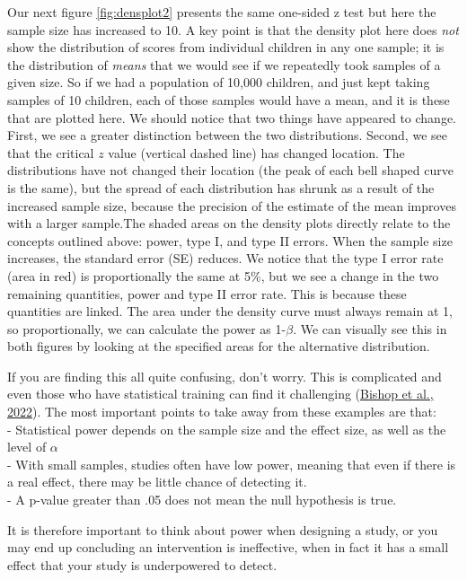 \documentclass{krantz}
\begin{document}
Our next figure \ref{fig:densplot2} presents the same one-sided z test but here the sample size has increased to 10. A key point is that the density plot here does \emph{not} show the distribution of scores from individual children in any one sample; it is the distribution of \emph{means} that we would see if we repeatedly took samples of a given size. So if we had a population of 10,000 children, and just kept taking samples of 10 children, each of those samples would have a mean, and it is these that are plotted here. We should notice that two things have appeared to change. First, we see a greater distinction between the two distributions. Second, we see that the critical \(z\) value (vertical dashed line) has changed location. The distributions have not changed their location (the peak of each bell shaped curve is the same), but the spread of each distribution has shrunk as a result of the increased sample size, because the precision of the estimate of the mean improves with a larger sample.The shaded areas on the density plots directly relate to the concepts outlined above: power, type I, and type II errors. When the sample size increases, the standard error (SE) reduces. We notice that the type I error rate (area in red) is proportionally the same at 5\%, but we see a change in the two remaining quantities, power and type II error rate. This is because these quantities are linked. The area under the density curve must always remain at 1, so proportionally, we can calculate the power as 1-\(\beta\). We can visually see this in both figures by looking at the specified areas for the alternative distribution.

If you are finding this all quite confusing, don't worry. This is complicated and even those who have statistical training can find it challenging (\protect\hyperlink{ref-bishop2022a}{Bishop et al., 2022}). The most important points to take away from these examples are that:\\
- Statistical power depends on the sample size and the effect size, as well as the level of \(\alpha\)\\
- With small samples, studies often have low power, meaning that even if there is a real effect, there may be little chance of detecting it.\\
- A p-value greater than .05 does not mean the null hypothesis is true.

It is therefore important to think about power when designing a study, or you may end up concluding an intervention is ineffective, when in fact it has a small effect that your study is underpowered to detect.
\end{document}
